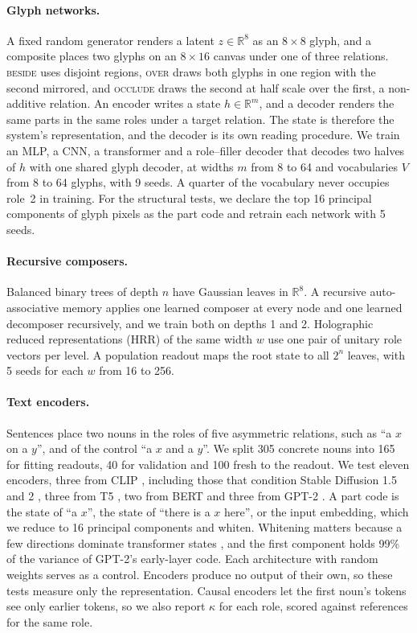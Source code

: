 \documentclass[10pt]{article}
\theoremstyle{plain}
\theoremstyle{remark}
\newcommand{\R}{\mathbb{R}}
\begin{document}
\paragraph{Glyph networks.} A fixed random generator renders a latent $z \in \R^{8}$ as an $8 \times 8$ glyph, and a composite places two glyphs on an $8 \times 16$ canvas under one of three relations. \textsc{beside} uses disjoint regions, \textsc{over} draws both glyphs in one region with the second mirrored, and \textsc{occlude} draws the second at half scale over the first, a non-additive relation. An encoder writes a state $h \in \R^m$, and a decoder renders the same parts in the same roles under a target relation. The state is therefore the system's representation, and the decoder is its own reading procedure. We train an MLP, a CNN, a transformer and a role--filler decoder that decodes two halves of $h$ with one shared glyph decoder, at widths $m$ from 8 to 64 and vocabularies $V$ from 8 to 64 glyphs, with 9 seeds. A quarter of the vocabulary never occupies role~2 in training. For the structural tests, we declare the top 16 principal components of glyph pixels as the part code and retrain each network with 5 seeds.

\paragraph{Recursive composers.} Balanced binary trees of depth $n$ have Gaussian leaves in $\R^8$. A recursive auto-associative memory \citep{pollack1990} applies one learned composer at every node and one learned decomposer recursively, and we train both on depths 1 and 2. Holographic reduced representations (HRR) of the same width $w$ use one pair of unitary role vectors per level. A population readout maps the root state to all $2^n$ leaves, with 5 seeds for each $w$ from 16 to 256.

\paragraph{Text encoders.} Sentences place two nouns in the roles of five asymmetric relations, such as ``a $x$ on a $y$'', and of the control ``a $x$ and a $y$''. We split 305 concrete nouns into 165 for fitting readouts, 40 for validation and 100 fresh to the readout. We test eleven encoders, three from CLIP \citep{radford2021clip}, including those that condition Stable Diffusion 1.5 and 2 \citep{rombach2022}, three from T5 \citep{raffel2020t5}, two from BERT \citep{devlin2019bert} and three from GPT-2 \citep{radford2019gpt2}. A part code is the state of ``a $x$'', the state of ``there is a $x$ here'', or the input embedding, which we reduce to 16 principal components and whiten. Whitening matters because a few directions dominate transformer states \citep{ethayarajh2019,timkey2021}, and the first component holds 99\% of the variance of GPT-2's early-layer code. Each architecture with random weights serves as a control. Encoders produce no output of their own, so these tests measure only the representation. Causal encoders let the first noun's tokens see only earlier tokens, so we also report $\kappa$ for each role, scored against references for the same role.
\end{document}

